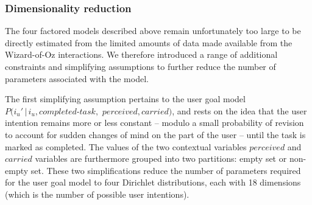 \subsubsection*{Dimensionality reduction}


The four factored models described above remain unfortunately too large to be directly estimated from the limited amounts of data made available from the Wizard-of-Oz interactions.  We therefore introduced a range of additional constraints and simplifying assumptions to further reduce the number of parameters associated with the model.


The first simplifying assumption pertains to the user goal model $P(i_u' \, | \, i_u, \mathit{completed\mbox{-}task},$ $\mathit{perceived}, \mathit{carried})$, and rests on the idea that the user intention remains more or less constant -- modulo a small probability of revision to account for sudden changes of mind on the part of the user -- until the task is marked as completed. The values of the two contextual variables $\mathit{perceived}$ and $\mathit{carried}$ variables are furthermore grouped into two partitions: empty set or non-empty set. These two simplifications reduce the number of parameters required for the user goal model to four Dirichlet distributions, each with 18 dimensions (which is the number of possible user intentions). 

